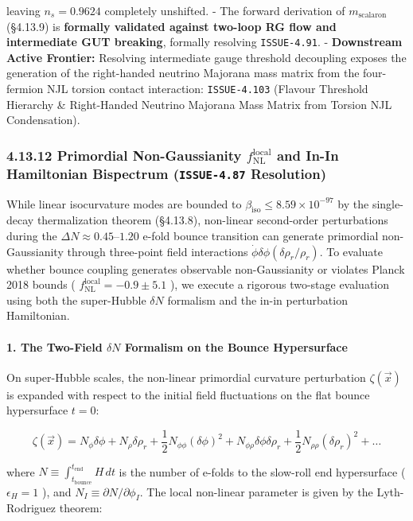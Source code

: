 \documentclass[11pt,a4paper]{article}
\theoremstyle{definition}\newtheorem{definition}{Definition}
\theoremstyle{remark}\newtheorem{remark}{Remark}
\begin{document}
leaving $n_s = 0.9624$ completely unshifted.
- The forward derivation of $m_{\text{scalaron}}$ (§4.13.9) is \textbf{formally validated against two-loop RG flow and intermediate GUT breaking}, formally resolving \texttt{ISSUE-4.91}.
- \textbf{Downstream Active Frontier:} Resolving intermediate gauge threshold decoupling exposes the generation of the right-handed neutrino Majorana mass matrix from the four-fermion NJL torsion contact interaction: \texttt{ISSUE-4.103} (Flavour Threshold Hierarchy \& Right-Handed Neutrino Majorana Mass Matrix from Torsion NJL Condensation).
\subsubsection{4.13.12 Primordial Non-Gaussianity $f_{\text{NL}}^{\text{local}}$ and In-In Hamiltonian Bispectrum (\texttt{ISSUE-4.87} Resolution)}

While linear isocurvature modes are bounded to $\beta_{\text{iso}} \le 8.59 \times 10^{-97}$ by the single-decay thermalization theorem (§4.13.8), non-linear second-order perturbations during the $\Delta N \approx 0.45\text{--}1.20$ e-fold bounce transition can generate primordial non-Gaussianity through three-point field interactions $\dot{\phi} \delta\phi (\delta\rho_r / \rho_r)$. To evaluate whether bounce coupling generates observable non-Gaussianity or violates Planck 2018 bounds ( $f_{\text{NL}}^{\text{local}} = -0.9 \pm 5.1$ ), we execute a rigorous two-stage evaluation using both the super-Hubble $\delta N$ formalism and the in-in perturbation Hamiltonian.
\paragraph{1. The Two-Field $\delta N$ Formalism on the Bounce Hypersurface}

On super-Hubble scales, the non-linear primordial curvature perturbation $\zeta(\vec{x})$ is expanded with respect to the initial field fluctuations on the flat bounce hypersurface $t = 0$:


\begin{equation}
\zeta(\vec{x}) = N_\phi \delta\phi + N_\rho \delta\rho_r + \frac{1}{2} N_{\phi\phi} (\delta\phi)^2 + N_{\phi\rho} \delta\phi \delta\rho_r + \frac{1}{2} N_{\rho\rho} (\delta\rho_r)^2 + \dots
\end{equation}


where $N \equiv \int_{t_{\text{bounce}}}^{t_{\text{end}}} H \, dt$ is the number of e-folds to the slow-roll end hypersurface ( $\epsilon_H = 1$ ), and $N_I \equiv \partial N / \partial \phi_I$. The local non-linear parameter is given by the Lyth-Rodriguez theorem:
\end{document}
